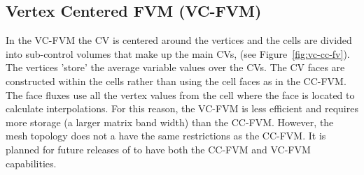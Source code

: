\subsection{Vertex Centered FVM (VC-FVM)}

In the VC-FVM the CV is centered around the vertices and the cells are
divided into sub-control volumes that make up the main CVs, (see
Figure~\ref{fig:vc-cc-fv}). The vertices 'store' the average variable
values over the CVs. The CV faces are constructed within the cells
rather than using the cell faces as in the CC-FVM. The face fluxes use
all the vertex values from the cell where the face is located to
calculate interpolations. For this reason, the VC-FVM is less
efficient and requires more storage (a larger matrix band width) than
the CC-FVM.  However, the mesh topology does not a have the same
restrictions as the CC-FVM. It is planned for future releases of
\FiPy{} to have both the CC-FVM and VC-FVM capabilities.

